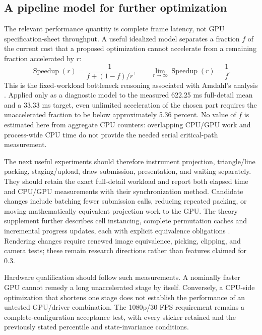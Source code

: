 \documentclass[a4paper,11pt]{article}
\begin{document}
\subsection{A pipeline model for further optimization}

The relevant performance quantity is complete frame latency, not GPU specification-sheet throughput. A useful idealized model separates a fraction \(f\) of the current cost that a proposed optimization cannot accelerate from a remaining fraction accelerated by \(r\):
\begin{equation}
\operatorname{Speedup}(r)=\frac{1}{f+(1-f)/r},\qquad
\lim_{r\to\infty}\operatorname{Speedup}(r)=\frac1f.
\label{eq:amdahl-model}
\end{equation}
This is the fixed-workload bottleneck reasoning associated with Amdahl's analysis \cite{amdahl}. Applied only as a diagnostic model to the measured 622.25 ms full-detail mean and a 33.33 ms target, even unlimited acceleration of the chosen part requires the unaccelerated fraction to be below approximately 5.36 percent. No value of \(f\) is estimated here from aggregate CPU counters: overlapping CPU/GPU work and process-wide CPU time do not provide the needed serial critical-path measurement.

The next useful experiments should therefore instrument projection, triangle/line packing, staging/upload, draw submission, presentation, and waiting separately. They should retain the exact full-detail workload and report both elapsed time and CPU/GPU measurements with their synchronization method. Candidate changes include batching fewer submission calls, reducing repeated packing, or moving mathematically equivalent projection work to the GPU. The theory supplement further describes cell instancing, complete permutation caches and incremental progress updates, each with explicit equivalence obligations \cite{puzzletheory}. Rendering changes require renewed image equivalence, picking, clipping, and camera tests; these remain research directions rather than features claimed for 0.3.

Hardware qualification should follow such measurements. A nominally faster GPU cannot remedy a long unaccelerated stage by itself. Conversely, a CPU-side optimization that shortens one stage does not establish the performance of an untested GPU/driver combination. The 1080p/30 FPS requirement remains a complete-configuration acceptance test, with every sticker retained and the previously stated percentile and state-invariance conditions.
\end{document}
